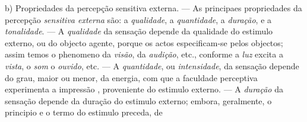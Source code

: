 b) Propriedades da percepção sensitiva externa. --- As principaes propriedades da percepção \emph{sensitiva externa} são: a \emph{qualidade}, a \emph{quantidade}, a \emph{duração}, e a \emph{tonalidade}. --- A \emph{qualidade} da   sensação depende da qualidade do estimulo externo, ou do objecto agente, porque os actos especificam-se pelos objectos; assim temos o phenomeno da \emph{visão}, da \emph{audição}, etc., conforme   a \emph{luz} excita a \emph{vista}, o \emph{som} o \emph{ouvido}, etc. --- A \emph{quantidade}, ou \emph{intensidade}, da sensação depende do grau, maior ou menor, da energia, com que a faculdade perceptiva experimenta a impressão  , proveniente do estimulo externo. --- A \emph{duração} da sensação depende da duração do estimulo externo; embora, geralmente, o principio e o termo do estimulo preceda, de

